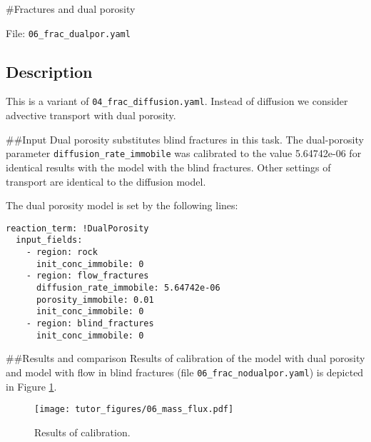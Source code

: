 \#Fractures and dual porosity

File: \texttt{06\_frac\_dualpor.yaml}

\subsection{Description}

This is a variant of \texttt{04\_frac\_diffusion.yaml}. Instead of
diffusion we consider advective transport with dual porosity.

\#\#Input Dual porosity substitutes blind fractures in this task. The
dual-porosity parameter \texttt{diffusion\_rate\_immobile} was
calibrated to the value 5.64742e-06 for identical results with the model
with the blind fractures. Other settings of transport are identical to
the diffusion model.

The dual porosity model is set by the following lines:

\begin{verbatim}
reaction_term: !DualPorosity
  input_fields:
    - region: rock
      init_conc_immobile: 0
    - region: flow_fractures
      diffusion_rate_immobile: 5.64742e-06
      porosity_immobile: 0.01
      init_conc_immobile: 0
    - region: blind_fractures
      init_conc_immobile: 0
\end{verbatim}

\#\#Results and comparison Results of calibration of the model with dual
porosity and model with flow in blind fractures (file
\texttt{06\_frac\_nodualpor.yaml}) is depicted in Figure
\ref{fig:calib}.

\begin{figure}
\hypertarget{fig:calib}{%
\centering
\texttt{[image: tutor\_figures/06\_mass\_flux.pdf]}
\caption{Results of calibration.}\label{fig:calib}
}
\end{figure}
